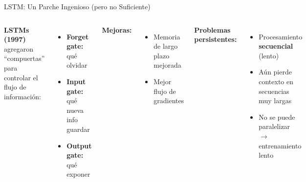 \documentclass[aspectratio=169]{beamer}
\begin{document}
\begin{frame}{LSTM: Un Parche Ingenioso (pero no Suficiente)}
    \begin{columns}
        \textbf{LSTMs (1997)} agregaron ``compuertas'' para controlar el flujo de información:
        \begin{itemize}
            \item \textbf{Forget gate:} qué olvidar
            \item \textbf{Input gate:} qué nueva info guardar
            \item \textbf{Output gate:} qué exponer
        \end{itemize}
        
        \vspace{0.3cm}
        \textbf{Mejoras:}
        \begin{itemize}
            \item[\faCheck] Memoria de largo plazo mejorada
            \item[\faCheck] Mejor flujo de gradientes
        \end{itemize}
        
        \textbf{Problemas persistentes:}
        \begin{itemize}
            \item[\faTimes] Procesamiento \textbf{secuencial} (lento)
            \item[\faTimes] Aún pierde contexto en secuencias muy largas
            \item[\faTimes] No se puede paralelizar $\rightarrow$ entrenamiento lento
        \end{itemize}
        
        \centering
\end{columns}
\end{frame}
\end{document}
